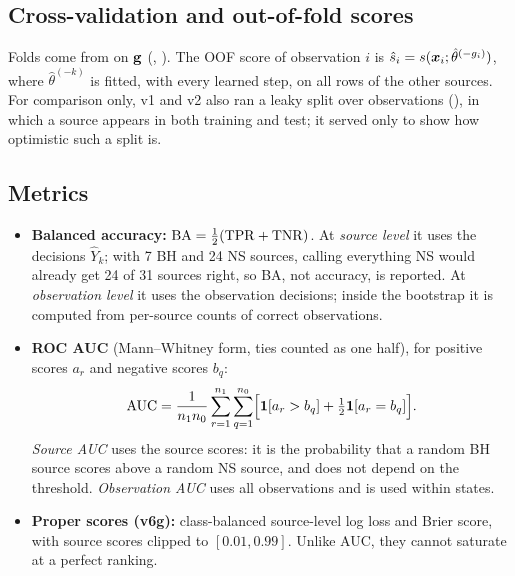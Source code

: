 \subsection{Cross-validation and out-of-fold scores}\label{sec:loso}
Folds come from  on $\mathbf{g}$ (, ). The OOF score of
observation $i$ is $\hat s_i=s(\bm{x}_i;\hat\theta^{(-g_i)})$, where $\hat\theta^{(-k)}$ is fitted, with every learned step,
on all rows of the other sources. For comparison only, v1 and v2 also ran a leaky split over observations
(), in which a source appears in both training and test; it served
only to show how optimistic such a split is.

\subsection{Metrics}\label{sec:metrics}
\begin{itemize}
\item \textbf{Balanced accuracy:} $\mathrm{BA}=\frac12(\mathrm{TPR}+\mathrm{TNR})$. At \emph{source level} it uses the decisions
$\hat Y_k$; with 7 BH and 24 NS sources, calling everything NS would already get 24 of 31 sources right, so BA, not
accuracy, is reported. At \emph{observation level} it uses the observation decisions; inside the bootstrap it is computed
from per-source counts of correct observations.
\item \textbf{ROC AUC} (Mann--Whitney form, ties counted as one half), for positive scores $a_r$ and negative scores $b_q$:
\begin{equation}
\mathrm{AUC}=\frac1{n_1n_0}\sum_{r=1}^{n_1}\sum_{q=1}^{n_0}\Bigl[\mathbf{1}\!\left[a_r>b_q\right]+\tfrac12\mathbf{1}\!\left[a_r=b_q\right]\Bigr].\label{eq:auc}
\end{equation}
\emph{Source AUC} uses the source scores: it is the probability that a random BH source scores above a random NS source, and
does not depend on the threshold. \emph{Observation AUC} uses all observations and is used within states.
\item \textbf{Proper scores (v6g):} class-balanced source-level log loss and Brier score, with source scores clipped to
$[0.01,0.99]$. Unlike AUC, they cannot saturate at a perfect ranking.
\end{itemize}

